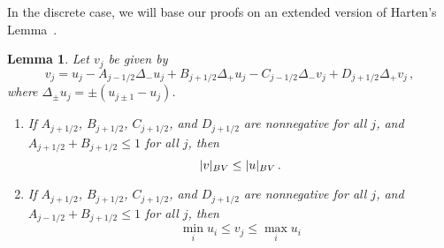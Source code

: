 \documentclass[11pt,leqno]{amsart}
\newtheorem{lemma}{Lemma}[section]
\newcommand{\normBV}[1]{\abs{#1}_{BV}}
\DeclarePairedDelimiter\abs{\lvert}{\rvert}
\begin{document}
In the discrete case, we will base our proofs on an extended version of Harten's Lemma~\cite[p.~118]{HoldenRisebro-book}.
\begin{lemma}
Let $v_j$ be given by
\begin{equation}\label{eq:Harten1}
  v_j=u_j - A_{j-1/2}\Delta_- u_j + B_{j+1/2}\Delta_+ u_j - C_{j-1/2}\Delta_- v_j + D_{j+1/2} \Delta_+ v_j\,,
\end{equation}  
where $\Delta_{\pm}u_j=\pm (u_{j\pm 1}-u_j)$.
\begin{enumerate}[label=\textup{(\roman*)}]
  \item \label{cond:Harten1} If $A_{j+1/2}$, $B_{j+1/2}$, $C_{j+1/2}$, and $D_{j+1/2}$ are nonnegative for all $j$, and $A_{j+1/2}+B_{j+1/2}\le 1$ for all $j$, then
\begin{equation*}
  \normBV{v}\le \normBV{u}\,.
\end{equation*}
\item \label{cond:Harten2} If $A_{j+1/2}$, $B_{j+1/2}$, $C_{j+1/2}$, and $D_{j+1/2}$ are nonnegative for all $j$, and $A_{j-1/2}+B_{j+1/2}\le 1$ for all $j$, then
\begin{equation*}
  \min_i u_i\le v_j\le \max_i u_i
\end{equation*}
\end{enumerate}
\end{lemma}
\end{document}
